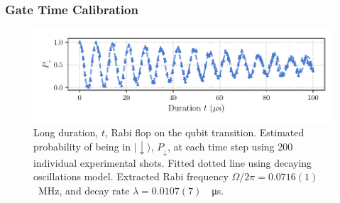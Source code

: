 \subsubsection{Gate Time Calibration}


    \begin{figure}
        \begin{center}
        \noindent\includegraphics[width=\linewidth]{
            figures/pdf_figure/long_flop.pdf
            }
        \end{center}
        \caption{Long duration, $t$, Rabi flop on the qubit transition. Estimated probability of being in $|\downarrow\rangle$, $P_\downarrow$, at each time step using 200 individual experimental shots. Fitted dotted line using decaying oscillations model. Extracted Rabi frequency $\Omega/2\pi = 0.0716(1)$~MHz, and decay rate $\lambda = 0.0107(7)$~\unit{\per\us}. 
            }
        \label{fig:Long Flop}
    \end{figure}

